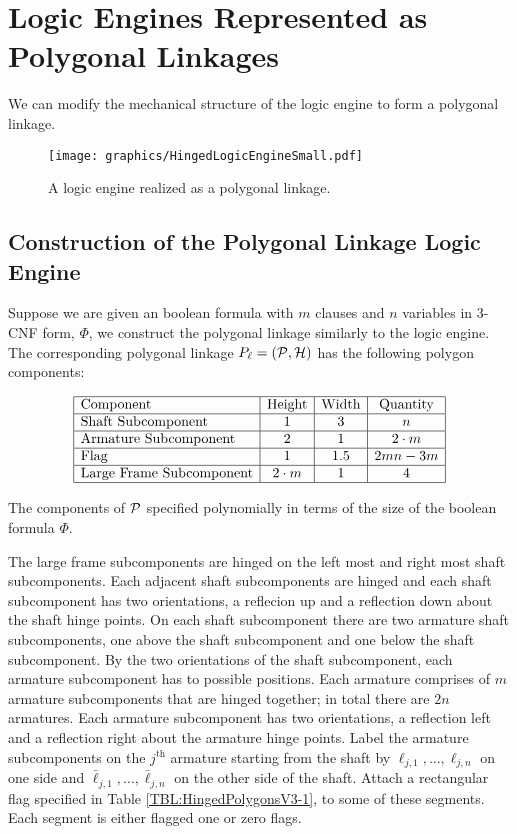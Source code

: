 \section{Logic Engines Represented as Polygonal Linkages}   
We can modify the mechanical structure of the logic engine to form a polygonal linkage.  

\begin{figure}[!htbp]
\begin{center}
\texttt{[image: graphics/HingedLogicEngineSmall.pdf]}
\caption{A logic engine realized as a polygonal linkage.}\label{fig:HingedLogicEngineSmall.pdf}
\end{center}
\end{figure}
\subsection{Construction of the Polygonal Linkage Logic Engine}
Suppose we are given an boolean formula with $m$ clauses and $n$ variables in 3-CNF form, $\Phi$, we construct the polygonal linkage similarly to the logic engine.
The corresponding polygonal linkage $P_\ell = ({\cal P},{\cal H})$ has the following polygon components:
\begin{center}
	\begin{table}\label{TBL:HingedPolygonsV3-1}
		$$\begin{array}{|l|c|c|c|}%
		 \hline
		 \text{Component} & \text{Height} & \text{Width} & \text{Quantity}\\\hline
		 \text{Shaft Subcomponent} & 1 & 3 & n\\\hline
		 \text{Armature Subcomponent} & 2 & 1 & 2\cdot m\\\hline
		 \text{Flag} & 1 & 1.5 & 2mn-3m\\\hline
		 \text{Large Frame Subcomponent} & 2\cdot m & 1 & 4\\\hline
		\end{array}$$
		\caption{The components of ${\cal P}$ specified polynomially in terms of the size of the boolean formula $\Phi$.}
	\end{table}
\end{center}
The large frame subcomponents are hinged on the left most and right most shaft subcomponents. Each adjacent shaft subcomponents are hinged and each shaft subcomponent has two orientations, a reflecion up and a reflection down about the shaft hinge points.  On each shaft subcomponent there are two armature shaft subcomponents, one above the shaft subcomponent and one below the shaft subcomponent.  By the two orientations of the shaft subcomponent, each armature subcomponent has to possible positions.  Each armature comprises of $m$ armature subcomponents that are hinged together; in total there are $2n$ armatures.  Each armature subcomponent has two orientations, a reflection left and a reflection right about the armature hinge points.  Label the armature subcomponents on the $j^\text{th}$ armature starting from the shaft by $\ell_{j,1},\ldots,\ell_{j,n}$ on one side and  $\bar{\ell}_{j,1},\ldots,\bar{\ell}_{j,n}$ on the other side of the shaft.  Attach a rectangular flag specified in Table \ref{TBL:HingedPolygonsV3-1}, to some of these segments. Each segment is either flagged one or zero flags.

